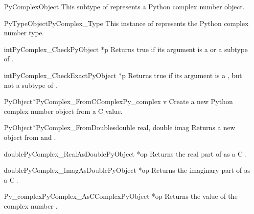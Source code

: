 \begin{ctypedesc}{PyComplexObject}
  This subtype of  represents a Python complex number
  object.
\end{ctypedesc}

\begin{cvardesc}{PyTypeObject}{PyComplex_Type}
  This instance of  represents the Python complex
  number type.
\end{cvardesc}

\begin{cfuncdesc}{int}{PyComplex_Check}{PyObject *p}
  Returns true if its argument is a  or a
  subtype of .
\end{cfuncdesc}

\begin{cfuncdesc}{int}{PyComplex_CheckExact}{PyObject *p}
  Returns true if its argument is a , but not a
  subtype of .
\end{cfuncdesc}

\begin{cfuncdesc}{PyObject*}{PyComplex_FromCComplex}{Py_complex v}
  Create a new Python complex number object from a C
   value.
\end{cfuncdesc}

\begin{cfuncdesc}{PyObject*}{PyComplex_FromDoubles}{double real, double imag}
  Returns a new  object from  and
  .
\end{cfuncdesc}

\begin{cfuncdesc}{double}{PyComplex_RealAsDouble}{PyObject *op}
  Returns the real part of  as a C .
\end{cfuncdesc}

\begin{cfuncdesc}{double}{PyComplex_ImagAsDouble}{PyObject *op}
  Returns the imaginary part of  as a C .
\end{cfuncdesc}

\begin{cfuncdesc}{Py_complex}{PyComplex_AsCComplex}{PyObject *op}
  Returns the  value of the complex number
  .
\end{cfuncdesc}




